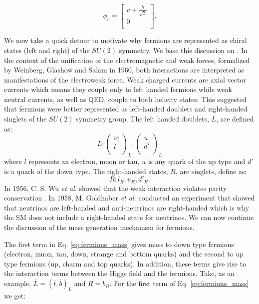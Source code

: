 \begin{equation}
	\phi_c=\begin{bmatrix}
	v+\frac{h}{\sqrt{2}} \\
	0 \\
	\end{bmatrix}.
\end{equation}

We now take a quick detour to motivate why fermions are represented as chiral states (left and right) of the $SU(2)$ symmetry. We base this discussion on \cite{rute}. In the context of the unification of the electromagnetic and weak forces, formalized by Weinberg, Glashow and Salam in 1960, both interactions are interpreted as manifestations of the electroweak force. Weak charged currents are axial vector currents which means they couple only to left handed fermions while weak neutral currents, as well as QED, couple to both helicity states. This suggested that fermions were better represented as left-handed doublets and right-handed singlets of the $SU(2)$ symmetry group. The left handed doublets, $L$, are defined as:
\begin{equation}
L:\begin{pmatrix}
\nu_l \\
l \\
\end{pmatrix}_L,
\begin{pmatrix}
u \\
d' \\
\end{pmatrix}_L
\end{equation}
where $l$ represents an electron, muon or tau, $u$ is any quark of the up type and $d'$ is a quark of the down type. The right-handed states, $R$, are singlets, define as:
\begin{equation}
	R: l_R,u_R,d'_R.
\end{equation} 
In 1956, C. S. Wu \textit{et al.} showed that the weak interaction violates parity conservation \cite{wu}. In 1958, M. Goldhaber \textit{et al.} conducted an experiment that showed that neutrinos are left-handed and anti-neutrinos are right-handed \cite{goldhaber} which is why the SM does not include a right-handed state for neutrinos. 
We can now continue the discussion of the mass generation mechanism for fermions.

The first term in Eq. \ref{eq:fermions_mass} gives mass to down type fermions (electron, muon, tau, down, strange and bottom quarks) and the second to up type fermions (up, charm and top quarks). In addition, these terms give rise to the interaction terms between the Higgs field and the fermions. Take, as an example, $\overline{L}=(\overline{t}, \overline{b})_L$ and $R=b_R$. For the first term of Eq. \ref{eq:fermions_mass} we get:

